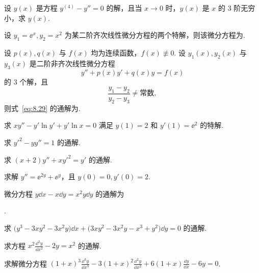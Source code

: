 	\begin{ti}
		设 $y(x)$ 是方程 $y^{(4)} - y'' = 0$ 的解，且当 $x \to 0$ 时，$y(x)$ 是 $x$ 的 $3$ 阶无穷小，求 $y(x)$.
	\end{ti}

	\begin{ti}
		设 $y_{1} = \ee^{x}, y_{2} = x^{2}$ 为某二阶齐次线性微分方程的两个特解，则该微分方程为\htwo.
	\end{ti}

	\begin{ti}
		设 $p(x), q(x)$ 与 $f(x)$ 均为连续函数，$f(x) \not\equiv 0$. 设 $y_{1}(x),y_{2}(x)$ 与 $y_{3}(x)$ 是二阶非齐次线性微分方程
		\begin{equation}\label{eq:8.29}
			y'' + p(x)y' + q(x)y = f(x)
		\end{equation}
		的 $3$ 个解，且
		\[
			\frac{y_{1} - y_{2}}{y_{2} - y_{3}} \ne \text{常数},
		\]
		则式~\eqref{eq:8.29} 的通解为\htwo.
	\end{ti}

	\begin{ti}
		求 $xy'' - y'\ln y' + y'\ln x = 0$ 满足 $y(1) = 2$ 和 $y'(1) = \ee^{2}$ 的特解.
	\end{ti}

	\begin{ti}
		求 $y'^{2} - yy'' = 1$ 的通解.
	\end{ti}

	\begin{ti}
		求 $(x + 2)y'' + xy'^{2} = y'$ 的通解.
	\end{ti}

	\begin{ti}
		求解 $y'' = \ee^{2y} + \ee^{y}$，且 $y(0) = 0,y'(0) = 2$.
	\end{ti}

	\begin{ti}
		微分方程 $y \dd{x} - x \dd{y} = x^{2} y \dd{y}$ 的通解为\htwo

		\noindent\htwo.
	\end{ti}

	\begin{ti}
		求 $\bigl( y^{3} - 3xy^{2} - 3x^{2}y \bigr) \dd{x} + \bigl( 3xy^{2} - 3x^{2}y - x^{3} + y^{2} \bigr) \dd{y} = 0$ 的通解.
	\end{ti}

	\begin{ti}
		求方程 $x^{2} \frac{\dd^{2}y}{\dd{x^{2}}} - 2y = x^{2}$ 的通解.
	\end{ti}

	\begin{ti}
		求解微分方程 $(1 + x)^{3} \frac{\dd^{3}y}{\dd{x^{3}}} - 3(1 + x)^{2} \frac{\dd^{2}y}{\dd{x^{2}}} + 6(1 + x) \frac{\dd{y}}{\dd{x}} - 6y = 0$.
	\end{ti}

